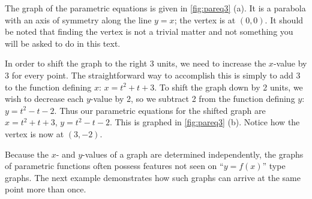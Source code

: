 {The graph of the parametric equations is given in \autoref{fig:pareq3} (a). It is a parabola with an axis of symmetry along the line $y=x$; the vertex is at $(0,0)$. It should be noted that finding the vertex is not a trivial matter and not something you will be asked to do in this text.

In order to shift the graph to the right 3 units, we need to increase the $x$-value by 3 for every point. The straightforward way to accomplish this is simply to add 3 to the function defining $x$: $x = t^2+t+3$. To shift the graph down by 2 units, we wish to decrease each $y$-value by 2, so we subtract 2 from the function defining $y$: $y = t^2-t-2$. Thus our parametric equations for the shifted graph are $x=t^2+t+3$, $y=t^2-t-2$. This is graphed in \autoref{fig:pareq3} (b). Notice how the vertex is now at $(3,-2)$.}

Because the $x$- and $y$-values of a graph are determined independently, the graphs of parametric functions often possess features not seen on ``$y=f(x)$'' type graphs. The next example demonstrates how such graphs can arrive at the same point more than once.

